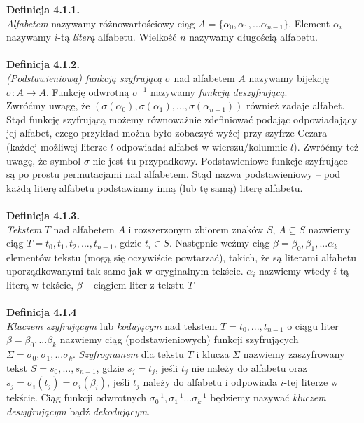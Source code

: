 \documentclass[a4paper]{article}
\begin{document}
\textbf{Definicja 4.1.1.}\\
\textit{Alfabetem} nazywamy różnowartościowy ciąg $A = \{\alpha_0, \alpha_1, ... \alpha_{n-1}\}$. Element $\alpha_i$ nazywamy $i$-tą \textit{literą} alfabetu. Wielkość $n$ nazywamy długością alfabetu. \\\\
\textbf{Definicja 4.1.2.}\\
\textit{(Podstawieniową) funkcją szyfrującą} $\sigma$ nad alfabetem $A$ nazywamy bijekcję $\sigma: A \to A$. Funkcję odwrotną $\sigma^{-1}$ nazywamy \textit{funkcją deszyfrującą}.
\\
Zwróćmy uwagę, że $(\sigma(\alpha_0), \sigma(\alpha_1),...,\sigma(\alpha_{n-1}))$ również zadaje alfabet. Stąd funkcję szyfrującą możemy równoważnie zdefiniować podając odpowiadający jej alfabet, czego przykład można było zobaczyć wyżej przy szyfrze Cezara (każdej możliwej literze $l$ odpowiadał alfabet w wierszu/kolumnie $l$). Zwróćmy też uwagę, że symbol $\sigma$ nie jest tu przypadkowy. Podstawieniowe funkcje szyfrujące są po prostu permutacjami nad alfabetem. Stąd nazwa podstawieniowy – pod każdą literę alfabetu podstawiamy inną (lub tę samą) literę alfabetu.
\\\\
\textbf{Definicja 4.1.3.}\\
\textit{Tekstem} $T$ nad alfabetem $A$ i rozszerzonym zbiorem znaków $S$, $A \subseteq S$ nazwiemy ciąg $T = t_0, t_1, t_2, ..., t_{n-1}$, gdzie $t_i \in S$. Następnie weźmy ciąg $\beta = \beta_0, \beta_1, ... \alpha_k$ elementów tekstu (mogą się oczywiście powtarzać), takich, że są literami alfabetu uporządkowanymi tak samo jak w oryginalnym tekście. $\alpha_i$ nazwiemy wtedy $i$-tą literą w tekście, $\beta$ – ciągiem liter z tekstu $T$
\\\\
\textbf{Definicja 4.1.4}\\
\textit{Kluczem szyfrującym} lub \textit{kodującym} nad tekstem $T = t_0, ..., t_{n-1}$ o ciągu liter $\beta = \beta_0, ... \beta_{k}$ nazwiemy ciąg (podstawieniowych) funkcji szyfrujących $\Sigma = \sigma_0, \sigma_1, ... \sigma_k$. \textit{Szyfrogramem} dla tekstu $T$ i klucza $\Sigma$ nazwiemy zaszyfrowany tekst $S = s_0, ..., s_{n-1}$, gdzie $s_j = t_j$, jeśli $t_j$ nie należy do alfabetu oraz $s_j = \sigma_i(t_j) = \sigma_i(\beta_i)$, jeśli $t_j$ należy do alfabetu i odpowiada $i$-tej literze w tekście. Ciąg funkcji odwrotnych $\sigma_0^{-1}, \sigma_1^{-1} ... \sigma_k^{-1}$ będziemy nazywać \textit{kluczem deszyfrującym} bądź \textit{dekodującym}.
\end{document}
